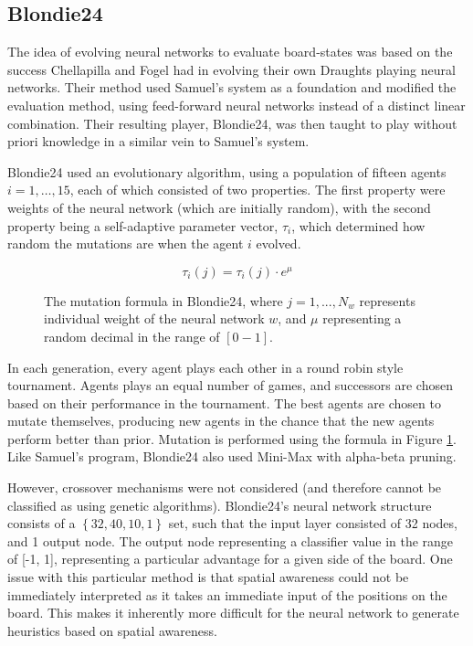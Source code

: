 \documentclass[12pt,a4paper]{article}
\begin{document}
    \subsection{Blondie24}
        The idea of evolving neural networks to evaluate board-states was based on the success Chellapilla and Fogel had in evolving their own Draughts playing neural networks. Their method used Samuel's system as a foundation and modified the evaluation method, using feed-forward neural networks instead of a distinct linear combination. Their resulting player, Blondie24, was then taught to play without priori knowledge in a similar vein to Samuel's system. \cite{chellapilla_evolving_1999}

        Blondie24 used an evolutionary algorithm, using a population of fifteen agents $i=1,\dots,15$, each of which consisted of two properties. The first property were weights of the neural network (which are initially random), with the second property being a self-adaptive parameter vector, $\tau_i$, which determined how random the mutations are when the agent $i$ evolved. 

        \begin{figure}[ht!]
            \centering
            \begin{equation}
            \tau_i(j) = \tau_i(j) \cdot e^{\mu}
            \end{equation}
            \caption{The mutation formula in Blondie24, where $j=1,...,N_w$ represents individual weight of the neural network $w$, and $\mu$ representing a random decimal in the range of $[0-1]$. \label{blondieMutation}}
        \end{figure}
        
        In each generation, every agent plays each other in a round robin style tournament. Agents plays an equal number of games, and successors are chosen based on their performance in the tournament. The best agents are chosen to mutate themselves, producing new agents in the chance that the new agents perform better than prior. Mutation is performed using the formula in Figure \ref{blondieMutation}. Like Samuel's program, Blondie24 also used Mini-Max with alpha-beta pruning.

        However, crossover mechanisms were not considered (and therefore cannot be classified as using genetic algorithms). Blondie24's neural network structure consists of a $\left\{ 32,40,10,1 \right\}$ set, such that the input layer consisted of 32 nodes, and 1 output node. The output node representing a classifier value in the range of [-1, 1], representing a particular advantage for a given side of the board. One issue with this particular method is that spatial awareness could not be immediately interpreted as it takes an immediate input of the positions on the board. This makes it inherently more difficult for the neural network to generate heuristics based on spatial awareness.
\end{document}
